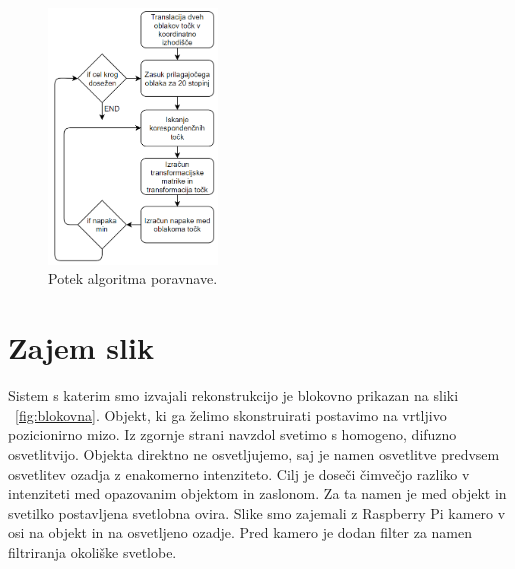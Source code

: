 \documentclass[journal,a4paper,twoside]{sty/IEEEtran}
\begin{document}
\begin{figure}[H]
	\centerline{\includegraphics[width=4.5cm]{fig/alg_poravnava}}
	\caption{Potek algoritma poravnave.}
	\label{fig:alg_poravnava}
\end{figure}

\section{Zajem slik}
Sistem s katerim smo izvajali rekonstrukcijo je blokovno prikazan na sliki ~\ref{fig:blokovna}. Objekt, ki ga želimo skonstruirati postavimo na vrtljivo pozicionirno mizo. Iz zgornje strani navzdol svetimo s homogeno, difuzno osvetlitvijo. Objekta direktno ne osvetljujemo, saj je namen osvetlitve predvsem osvetlitev ozadja z enakomerno intenziteto. Cilj je doseči čimvečjo razliko v intenziteti med opazovanim objektom in zaslonom. Za ta namen je med objekt in svetilko postavljena svetlobna ovira. Slike smo zajemali z Raspberry Pi kamero v osi na objekt in na osvetljeno ozadje. Pred kamero je dodan filter za namen filtriranja okoliške svetlobe.
\end{document}
